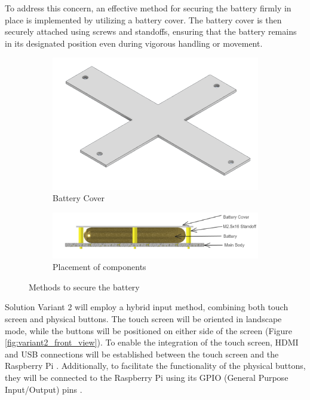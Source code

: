 To address this concern, an effective method for securing the battery firmly in place is implemented by utilizing a battery cover. The battery cover is then securely attached using screws and standoffs, ensuring that the battery remains in its designated position even during vigorous handling or movement.

\begin{figure}[h!]
    \centering
    \begin{subfigure}[c]{\textwidth}
        \begin{minipage}{\textwidth}
            \centering
            \includegraphics[height=4 cm]{texs/Part1/chapter4/image/v27.png}
        \end{minipage}
        \caption{Battery Cover}
        \label{fig:variant2_battery_cover}
    \end{subfigure}
    \begin{subfigure}[c]{\textwidth}
        \begin{minipage}{\textwidth}
            \centering
            \includegraphics[height=3 cm]{texs/Part1/chapter4/image/v28.png}
        \end{minipage}
        \caption{Placement of components}
        \label{fig:variant2_battery_placement}
    \end{subfigure}
    \caption{Methods to secure the battery}
    \label{fig:variant2_battery}
\end{figure}


Solution Variant 2 will employ a hybrid input method, combining both touch screen and physical buttons. The touch screen will be oriented in landscape mode, while the buttons will be positioned on either side of the screen (Figure \ref{fig:variant2_front_view}). To enable the integration of the touch screen, HDMI and USB connections will be established between the touch screen and the Raspberry Pi \cite{Sunfounder}. Additionally, to facilitate the functionality of the physical buttons, they will be connected to the Raspberry Pi using its GPIO (General Purpose Input/Output) pins \cite{Soren21}.

